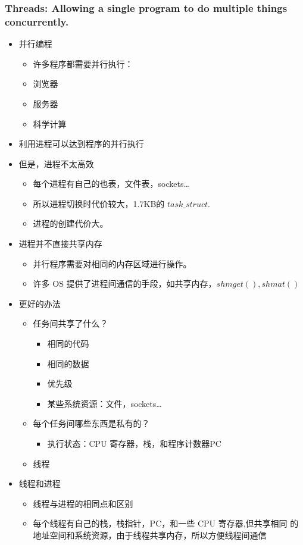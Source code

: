 \documentclass[a4paper, 11pt]{article}
\begin{document}
\subsubsection{Threads: Allowing a single program to do
multiple things concurrently.}
\begin{itemize}
  \item{并行编程}
	\begin{itemize}
	  \item{许多程序都需要并行执行：}
	  \item{浏览器}
	  \item{服务器}
	  \item{科学计算}
	  \end{itemize}
	\item{利用进程可以达到程序的并行执行}
	\item{但是，进程不太高效}
	  \begin{itemize}
		\item{每个进程有自己的也表，文件表，sockets\dots}
		\item{所以进程切换时代价较大，1.7KB的 $task\_struct$.}
		\item{进程的创建代价大。}
		\end{itemize}
	  \item{进程并不直接共享内存}
		\begin{itemize}
		  \item{并行程序需要对相同的内存区域进行操作。}
		  \item{许多 OS 提供了进程间通信的手段，如共享内存，$shmget(),
			shmat()$}
		  \end{itemize}
		\item{更好的办法}
		  \begin{itemize}
			\item{任务间共享了什么？}
			  \begin{itemize}
				\item{相同的代码}
				\item{相同的数据}
				\item{优先级}
				\item{某些系统资源：文件，sockets\dots}
				\end{itemize}
			\item{每个任务间哪些东西是私有的？}
			  \begin{itemize}
				\item{执行状态：CPU 寄存器，栈，和程序计数器PC}
				\end{itemize}
			  \item{线程}
			\end{itemize}
		  \item{线程和进程}
			\begin{itemize}
			  \item{线程与进程的相同点和区别}
			  \item{每个线程有自己的栈，栈指针，PC，和一些 CPU 寄存器,但共享相同
				的地址空间和系统资源，由于线程共享内存，所以方便线程间通信}
			  \end{itemize}
\end{itemize}
\end{document}
